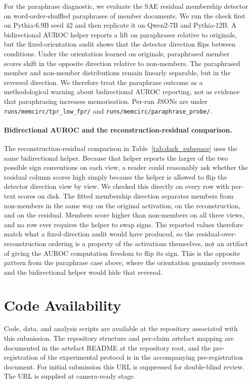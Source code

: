 For the paraphrase diagnostic, we evaluate the SAE residual membership detector on word-order-shuffled paraphrases of member documents. We run the check first on Pythia-6.9B seed 42 and then replicate it on Qwen2-7B and Pythia-12B. A bidirectional AUROC helper reports a lift on paraphrases relative to originals, but the fixed-orientation audit shows that the detector direction flips between conditions. Under the orientation learned on originals, paraphrased member scores shift in the opposite direction relative to non-members. The paraphrased member and non-member distributions remain linearly separable, but in the reversed direction. We therefore treat the paraphrase outcome as a methodological warning about bidirectional AUROC reporting, not as evidence that paraphrasing increases memorisation. Per-run JSONs are under \texttt{runs/\allowbreak{}memcirc/\allowbreak{}tpr\_\allowbreak{}low\_\allowbreak{}fpr/\allowbreak{}} and \texttt{runs/\allowbreak{}memcirc/\allowbreak{}paraphrase\_\allowbreak{}probe/\allowbreak{}}.

\paragraph{Bidirectional AUROC and the reconstruction-residual comparison.}
The reconstruction-residual comparison in Table~\ref{tab:dark_subspace} uses the same bidirectional helper. Because that helper reports the larger of the two possible sign conventions on each view, a reader could reasonably ask whether the residual column scores high simply because the helper is allowed to flip the detector direction view by view. We checked this directly on every row with per-text scores on disk. The fitted membership direction separates members from non-members in the same way on the original activation, on the reconstruction, and on the residual. Members score higher than non-members on all three views, and no row ever requires the helper to swap signs. The reported values therefore match what a fixed-direction audit would have produced, so the residual-over-reconstruction ordering is a property of the activations themselves, not an artifact of giving the AUROC computation freedom to flip its sign. This is the opposite pattern from the paraphrase case above, where the orientation genuinely reverses and the bidirectional helper would hide that reversal.

\FloatBarrier

\section*{Code Availability}

Code, data, and analysis scripts are available at the repository associated with this submission. The repository structure and per-claim artefact mapping are documented in the artefact README at the repository root, and the pre-registration of the experimental protocol is in the accompanying pre-registration document. For initial submission this URL is suppressed for double-blind review. The URL is supplied at camera-ready stage.